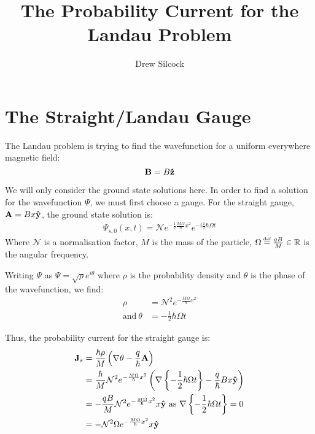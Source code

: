 \documentclass{article}
\title{The Probability Current for the Landau Problem}
\author{Drew Silcock}
\begin{document}
\maketitle

\section{The Straight/Landau Gauge}

The Landau problem is trying to find the wavefunction for a uniform everywhere
magnetic field:
\begin{equation}
    \mathbf{B} = B \mathbf{ \hat{ z }}
\end{equation}

We will only consider the ground state solutions here. In order to find a
solution for the wavefunction $\Psi$, we must first choose a gauge. For the
straight gauge, $\mathbf{A} = B x \mathbf{ \hat{ y }}$, the ground state solution is:
\begin{align}
    \Psi_{s,0}(x,t) = \mathcal{N} e^{- \frac{1}{2} \frac{M \Omega}{\hbar} x^2} e^{-i
    \frac{1}{2} \hbar \Omega t}
\end{align}
Where $\mathcal{N}$ is a normalisation factor, $M$ is the mass of the particle,
$\Omega \defeq \frac{q B}{M} \in \mathbb{R}$ is the angular frequency.

Writing $\Psi$ as $\Psi = \sqrt{\rho} e^{i \theta}$ where $\rho$ is the
probability density and $\theta$ is the phase of the wavefunction, we find:
\begin{align}
    \rho &= \mathcal{N}^2 e^{- \frac{M \Omega}{\hbar} x^2} \\
    \textrm{and}~ \theta &= - \frac{1}{2} \hbar \Omega t
\end{align}

Thus, the probability current for the straight gauge is:
\begin{align}
    \mathbf{J}_s &= \frac{\hbar \rho}{M} \left( \nabla \theta - \frac{q}{\hbar}
        \mathbf{A} \right) \\
    &= \frac{\hbar}{M} \mathcal{N}^2 e^{- \frac{M \Omega}{\hbar} x^2}
       \left( \nabla \left\{
       - \frac{1}{2} \hbar \Omega t \right\}
       - \frac{q}{\hbar} B x \mathbf{ \hat{ y }} \right) \\
    &= - \frac{q B}{M} \mathcal{N}^2 e^{- \frac{M \Omega}{\hbar} x^2} x \mathbf{ \hat{ y }}
       ~\textrm{as}~ \nabla \left\{ - \frac{1}{2} \hbar \Omega t \right\} = 0 \\
    &= - \mathcal{N}^2 \Omega e^{- \frac{M \Omega}{\hbar} x^2} x \mathbf{ \hat{ y }}
\end{align}
\end{document}
